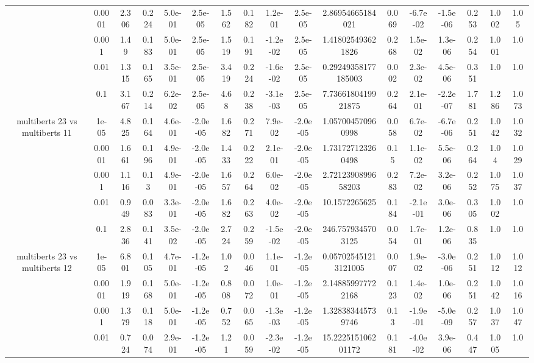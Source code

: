 \begin{tabular}{|c|c|c|c|c|c|c|c|c|c|c|c|c|c|c|c|c|}
 & 0.0001 & 2.306 & 0.224 & 5.0e-01 & 2.5e-05 & 1.562 & 0.182 & 1.2e-01 & 2.5e-05 & 2.86954665184021 & 0.069 & -6.7e-02 & -1.5e-06 & 0.253 & 1.002 & 1.05 \\
 & 0.001 & 1.49 & 0.183 & 5.0e-01 & 2.5e-05 & 1.519 & 0.191 & -1.2e-02 & 2.5e-05 & 1.418025493621826 & 0.268 & 1.5e-02 & 1.3e-06 & 0.254 & 1.001 & 1.0 \\
 & 0.01 & 1.315 & 0.165 & 3.5e-01 & 2.5e-05 & 3.419 & 0.224 & -1.6e-02 & 2.5e-05 & 0.29249358177185003 & 0.002 & 2.3e-02 & 4.5e-06 & 0.351 & 1.0 & 1.0 \\
 & 0.1 & 3.167 & 0.214 & 6.2e-02 & 2.5e-05 & 4.68 & 0.238 & -3.1e-03 & 2.5e-05 & 7.7366180419921875 & 0.264 & 2.1e-01 & -2.2e-07 & 1.781 & 1.286 & 1.073 \\
\hline
\multirow{5}{*}{multiberts 23 vs multiberts 11} & 1e-05 & 4.825 & 0.164 & 4.6e-01 & -2.0e-05 & 1.682 & 0.271 & 7.9e-02 & -2.0e-05 & 1.057004570960998 & 0.058 & 6.7e-02 & -6.7e-06 & 0.251 & 1.042 & 1.032 \\
 & 0.0001 & 1.661 & 0.196 & 4.9e-01 & -2.0e-05 & 1.433 & 0.222 & 2.1e-01 & -2.0e-05 & 1.731727123260498 & 0.15 & 1.1e-02 & 5.5e-06 & 0.264 & 1.04 & 1.029 \\
 & 0.001 & 1.116 & 0.13 & 4.9e-01 & -2.0e-05 & 1.657 & 0.264 & 6.0e-02 & -2.0e-05 & 2.7212390899658203 & 0.283 & 7.2e-02 & 3.2e-06 & 0.252 & 1.075 & 1.037 \\
 & 0.01 & 0.949 & 0.083 & 3.3e-01 & -2.0e-05 & 1.682 & 0.263 & 4.0e-02 & -2.0e-05 & 10.1572265625 & 0.184 & -2.1e-01 & 3.0e-06 & 0.305 & 1.002 & 1.0 \\
 & 0.1 & 2.836 & 0.141 & 3.5e-02 & -2.0e-05 & 2.724 & 0.259 & -1.5e-02 & -2.0e-05 & 246.7579345703125 & 0.054 & 1.7e-01 & 1.2e-06 & 0.835 & 1.0 & 1.0 \\
\hline
\multirow{5}{*}{multiberts 23 vs multiberts 12} & 1e-05 & 6.801 & 0.105 & 4.7e-01 & -1.2e-05 & 1.02 & 0.046 & 1.1e-01 & -1.2e-05 & 0.057025451213121005 & 0.007 & 1.9e-02 & -3.0e-06 & 0.251 & 1.012 & 1.012 \\
 & 0.0001 & 1.919 & 0.168 & 5.0e-01 & -1.2e-05 & 0.808 & 0.072 & 1.0e-01 & -1.2e-05 & 2.148859977722168 & 0.123 & 1.4e-02 & 1.0e-06 & 0.251 & 1.042 & 1.016 \\
 & 0.001 & 1.379 & 0.118 & 5.0e-01 & -1.2e-05 & 0.752 & 0.065 & -1.3e-03 & -1.2e-05 & 1.328383445739746 & 0.13 & -1.9e-01 & -5.0e-09 & 0.257 & 1.037 & 1.047 \\
 & 0.01 & 0.724 & 0.074 & 2.9e-01 & -1.2e-05 & 1.21 & 0.059 & -2.3e-02 & -1.2e-05 & 15.222515106201172 & 0.181 & -4.0e-02 & 3.9e-06 & 0.447 & 1.005 & 1.0 \\

\end{tabular}
